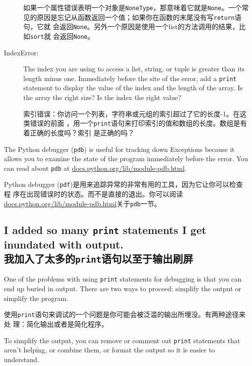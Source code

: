 \documentclass[10pt]{book}
\begin{document}
\begin{CJK}{UTF8}{gbsn}
\begin{description}
如果一个属性错误表明一个对象是{\tt NoneType}，那意味着它就是{\tt None}。一个常
见的原因是忘记从函数返回一个值；如果你在函数的末尾没有写{\tt return}语句，它就
会返回{\tt None}。另外一个原因是使用一个list的方法调用的结果，比如{\tt sort}就
会返回{\tt None}。

\item[IndexError:] The index you are using
to access a list, string, or tuple is greater than
its length minus one.  Immediately before the site of the error,
add a {\tt print} statement to display
the value of the index and the length of the array.
Is the array the right size?  Is the index the right value?

索引错误：你访问一个列表，字符串或元组的索引超过了它的长度-1。在这类错误的前面
，用一个{\tt print}语句来打印索引的值和数组的长度。数组是有着正确的长度吗？索引
是正确的吗？

\end{description}

The Python debugger ({\tt pdb}) is useful for tracking down
Exceptions because it allows you to examine the state of the
program immediately before the error.  You can read
about {\tt pdb} at \url{docs.python.org/lib/module-pdb.html}.

Python debugger ({\tt pdf})是用来追踪异常的非常有用的工具，因为它让你可以检查程
序在出现错误时的状态。而不是直接的退出。你可以阅读
\url{docs.python.org/lib/module-pdb.html}关于{\tt pdb}一节。

\subsection{I added so many {\tt print} statements I get inundated with
output.\\我加入了太多的{\tt print}语句以至于输出刷屏}

One of the problems with using {\tt print} statements for debugging
is that you can end up buried in output.  There are two ways
to proceed: simplify the output or simplify the program.

使用{\tt print}语句来调试的一个问题是你可能会被泛滥的输出所埋没。有两种途径来处
理：简化输出或者是简化程序。

To simplify the output, you can remove or comment out {\tt print}
statements that aren't helping, or combine them, or format
the output so it is easier to understand.


\end{CJK}
\end{document}
